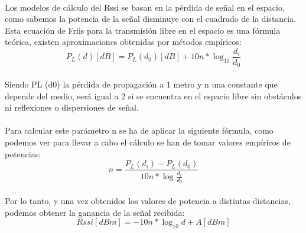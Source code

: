 \documentclass[paper=a4, fontsize=11pt,twoside]{scrartcl}	%
\begin{document}
            \paragraph{}
            Los modelos de cálculo del Rssi se basan en la pérdida de señal en el espacio, como sabemos la potencia de la señal
            disminuye con el cuadrado de la distancia. Esta ecuación de Friis para la transmisión libre en el espacio es 
            una fórmula teórica, existen aproximaciones obtenidas por métodos empíricos:
            \begin{equation}
                P_L(d) [dB] = P_L(d_0) [dB] + 10n * \log_{10} \frac{d_i}{d_0} 
            \end{equation}
            \paragraph{}
            Siendo PL (d0) la pérdida de propagación a 1 metro y n una constante que depende del medio, será igual
            a 2 si se encuentra en el espacio libre sin obstáculos ni reflexiones o dispersiones de señal.
            \paragraph{}
            Para calcular este parámetro n se ha de aplicar la siguiente fórmula, como podemos ver para llevar a cabo el 
            cálculo se han de tomar valores empíricos de potencias:
            \begin{equation}
                n = \frac{ P_L(d_i) - P_L(d_0) }{10n*\log_{}\frac{d_i}{d_0}}
            \end{equation}
            \paragraph{}
            Por lo tanto, y una vez obtenidos los valores de potencia a distintas distancias, podemos obtener la ganancia
            de la señal recibida:
            \begin{equation}
                Rssi [dBm] = -10n*\log_{10} d+ A[dBm]
            \end{equation}
\end{document}
